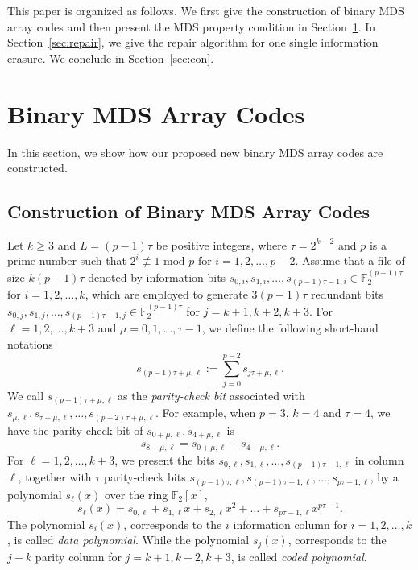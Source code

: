 \documentclass[conference]{IEEEtran}
\begin{document}
This paper is organized as follows. We first give the construction of binary MDS array codes and then present the MDS property condition in Section~\ref{sec:constr}. In Section~\ref{sec:repair}, we give the repair algorithm for one single information erasure. 
We conclude in Section~\ref{sec:con}.



\section{Binary MDS Array Codes}
\label{sec:constr}
In this section, we show how our proposed new binary MDS array codes are constructed.
\subsection{Construction of Binary MDS Array Codes}
Let $k\geq 3$ and $L=(p-1)\tau$ be positive integers, where $\tau=2^{k-2}$ and $p$ is a prime number such that $2^i\not\equiv 1\text{ mod } p$ for $i=1,2,\ldots,p-2$. Assume that a file of size $k(p-1)\tau$ denoted by information bits $s_{0,i},s_{1,i},\ldots, s_{(p-1)\tau-1,i}\in \mathbb{F}_2^{(p-1)\tau}$ for $i=1,2,\ldots,k$, which are employed to generate $3(p-1)\tau$ redundant bits $s_{0,j},s_{1,j},\ldots, s_{(p-1)\tau-1,j}\in \mathbb{F}_2^{(p-1)\tau}$ for $j=k+1,k+2,k+3$.
For $\ell=1,2,\ldots,k+3$ and $\mu=0,1,\ldots,\tau-1$, we define the following short-hand notations
\begin{equation}
s_{(p-1)\tau+\mu,\ell} := \sum_{j=0}^{p-2} s_{j\tau+\mu,\ell}.
\label{eq:check1}
\end{equation}
We call $s_{(p-1)\tau+\mu,\ell}$ as the \emph{parity-check bit} associated with $s_{\mu,\ell},s_{\tau+\mu,\ell},\ldots,s_{(p-2)\tau+\mu,\ell}$. For example, when $p=3$, $k=4$ and $\tau=4$, we have the parity-check bit of $s_{0+\mu,\ell},s_{4+\mu,\ell}$ is $$s_{8+\mu,\ell}=s_{0+\mu,\ell}+s_{4+\mu,\ell}.$$ For $\ell=1,2,\ldots,k+3$, we present the bits $s_{0,\ell},s_{1,\ell},\ldots,s_{(p-1)\tau-1,\ell}$ in column $\ell$, together with $\tau$ parity-check bits $s_{(p-1)\tau,\ell},s_{(p-1)\tau+1,\ell},\ldots,s_{p\tau-1,\ell}$, by a polynomial $s_{\ell}(x)$ over the ring $\mathbb{F}_2[x]$,
$$s_\ell(x)=s_{0,\ell}+s_{1,\ell}x+s_{2,\ell}x^2+\ldots+s_{p\tau-1,\ell}x^{p\tau-1}.$$
The polynomial $s_{i}(x)$, corresponds to the $i$ information column for $i=1,2,\ldots,k$, is called \emph{data polynomial}. While the polynomial $s_{j}(x)$, corresponds to the $j-k$ parity column for $j=k+1,k+2,k+3$, is called \emph{coded polynomial}.
\end{document}
